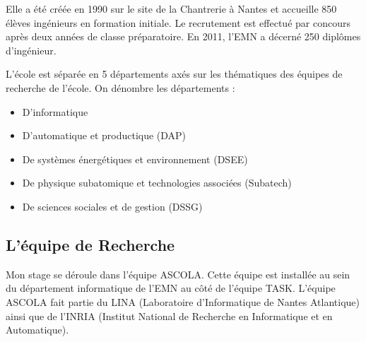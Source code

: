 \documentclass[a4paper, 11pt]{report}
\begin{document}
Elle a été créée en 1990 sur le site de la Chantrerie à Nantes et accueille 850 élèves ingénieurs en formation initiale. Le recrutement est effectué par concours après deux années de classe préparatoire. En 2011, l’EMN a décerné 250 diplômes d’ingénieur.

L’école est séparée en 5 départements axés sur les thématiques des équipes de recherche de l'école. On dénombre les départements :
\begin{itemize}
	\item D'informatique
	\item D'automatique et productique (DAP)
	\item De systèmes énergétiques et environnement (DSEE)
	\item De physique subatomique et technologies associées (Subatech)
	\item De sciences sociales et de gestion (DSSG)
\end{itemize}

		\subsection{L'équipe de Recherche}
Mon stage se déroule dans l'équipe ASCOLA. Cette équipe est installée au sein du département informatique de l’EMN au côté de l'équipe TASK. L'équipe ASCOLA fait partie du LINA (Laboratoire d'Informatique de Nantes Atlantique) ainsi que de l'INRIA (Institut National de Recherche en Informatique et en Automatique).
\end{document}
